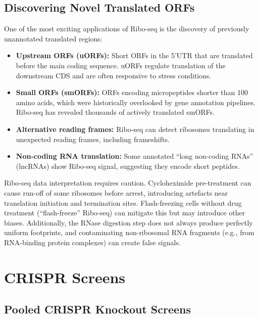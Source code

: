 \subsection{Discovering Novel Translated ORFs}
\label{subsec:specialized:novel-orfs}

One of the most exciting applications of Ribo-seq is the discovery of previously unannotated translated regions:

\begin{itemize}[itemsep=3pt]
  \item \textbf{Upstream ORFs (uORFs):} Short ORFs in the 5'UTR that are translated before the main coding sequence. uORFs regulate translation of the downstream CDS and are often responsive to stress conditions.
  \item \textbf{Small ORFs (smORFs):} ORFs encoding micropeptides shorter than 100 amino acids, which were historically overlooked by gene annotation pipelines. Ribo-seq has revealed thousands of actively translated smORFs.
  \item \textbf{Alternative reading frames:} Ribo-seq can detect ribosomes translating in unexpected reading frames, including frameshifts.
  \item \textbf{Non-coding RNA translation:} Some annotated ``long non-coding RNAs'' (lncRNAs) show Ribo-seq signal, suggesting they encode short peptides.
\end{itemize}

\begin{warningbox}
Ribo-seq data interpretation requires caution. Cycloheximide pre-treatment can cause run-off of some ribosomes before arrest, introducing artefacts near translation initiation and termination sites. Flash-freezing cells without drug treatment (``flash-freeze'' Ribo-seq) can mitigate this but may introduce other biases. Additionally, the RNase digestion step does not always produce perfectly uniform footprints, and contaminating non-ribosomal RNA fragments (e.g., from RNA-binding protein complexes) can create false signals.
\end{warningbox}


\section{CRISPR Screens}
\label{sec:specialized:crispr-screens}

\subsection{Pooled CRISPR Knockout Screens}
\label{subsec:specialized:crispr-ko}

